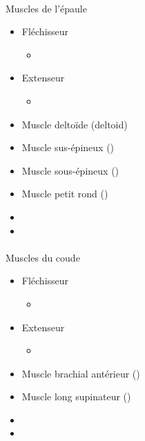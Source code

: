 \documentclass[pdftex,a4paper,11pt]{report}
\numberwithin{equation}{subsection}
\begin{document}
\paragraph{}
Muscles de l'épaule
\begin{itemize}
    \item Fléchisseur
    \begin{itemize}
        \item 
    \end{itemize}
    \item Extenseur
    \begin{itemize}
        \item 
    \end{itemize}

    \item Muscle deltoïde (deltoid)
    \item Muscle sus-épineux ()
    \item Muscle sous-épineux ()
    \item Muscle petit rond ()
    \item 
    \item 
\end{itemize}

\paragraph{}
Muscles du coude
\begin{itemize}
    \item Fléchisseur
    \begin{itemize}
        \item 
    \end{itemize}
    \item Extenseur
    \begin{itemize}
        \item 
    \end{itemize}

    \item Muscle brachial antérieur ()
    \item Muscle long supinateur ()
    \item 
    \item 
\end{itemize}
\end{document}
